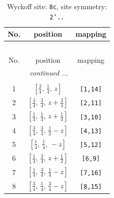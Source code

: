 \documentclass[fleqn,8pt]{jsarticle}
\begin{document}
\renewcommand{\arraystretch}{1.2}
\begin{longtable}{ccc}
\caption{Wyckoff site: {\tt 8c}, site symmetry: {\tt 2'..}}
 \\
 \hline \hline
No. & position & mapping \\ \hline \endfirsthead

\multicolumn{2}{l}{\tablename\ \thetable{}} \\
 \hline \hline
No. & position & mapping \\ \hline \endhead

 \hline \hline
\multicolumn{2}{r}{\footnotesize\it continued ...} \\ \endfoot

 \hline \hline
\multicolumn{2}{r}{} \\ \endlastfoot

1 & $\left[ \frac{3}{4},\, \frac{1}{4},\, z \right]$ & {\tt [1,14]} \\ \hline
2 & $\left[ \frac{3}{4},\, \frac{3}{4},\, z + \frac{3}{4} \right]$ & {\tt [2,11]} \\ \hline
3 & $\left[ \frac{1}{4},\, \frac{1}{4},\, z + \frac{1}{4} \right]$ & {\tt [3,10]} \\ \hline
4 & $\left[ \frac{3}{4},\, \frac{3}{4},\, \frac{1}{2} - z \right]$ & {\tt [4,13]} \\ \hline
5 & $\left[ \frac{1}{4},\, \frac{1}{4},\, - z \right]$ & {\tt [5,12]} \\ \hline
6 & $\left[ \frac{1}{4},\, \frac{3}{4},\, z + \frac{1}{2} \right]$ & {\tt [6,9]} \\ \hline
7 & $\left[ \frac{1}{4},\, \frac{3}{4},\, \frac{1}{4} - z \right]$ & {\tt [7,16]} \\ \hline
8 & $\left[ \frac{3}{4},\, \frac{1}{4},\, \frac{3}{4} - z \right]$ & {\tt [8,15]} \\
\end{longtable}
\renewcommand{\arraystretch}{1.2}
\end{document}
